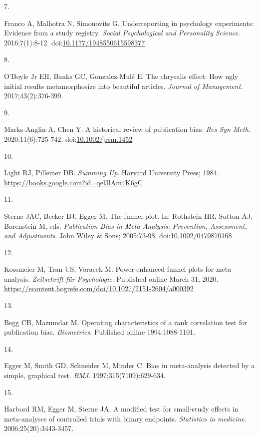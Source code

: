 \documentclass[
  american,
  man, donotrepeattitle,floatsintext]{apa7}
\newlength{\cslhangindent}
\newlength{\csllabelwidth}
\newenvironment{CSLReferences}[2] %
 {\begin{list}{}{%
  \setlength{\itemindent}{0pt}
  \setlength{\leftmargin}{0pt}
  \setlength{\parsep}{0pt}
  \ifodd #1
   \setlength{\leftmargin}{\cslhangindent}
   \setlength{\itemindent}{-1\cslhangindent}
  \fi
  \setlength{\itemsep}{#2\baselineskip}}}
 {\end{list}}
\newcommand{\CSLLeftMargin}[1]{\parbox[t]{\csllabelwidth}{\strut#1\strut}}
\newcommand{\CSLRightInline}[1]{\parbox[t]{\linewidth - \csllabelwidth}{\strut#1\strut}}
\begin{document}
\begin{CSLReferences}{0}{1}
\CSLLeftMargin{7. }%
\CSLRightInline{Franco A, Malhotra N, Simonovits G. Underreporting in psychology experiments: Evidence from a study registry. \emph{Social Psychological and Personality Science}. 2016;7(1):8-12. doi:\href{https://doi.org/10.1177/1948550615598377}{10.1177/1948550615598377}}

\CSLLeftMargin{8. }%
\CSLRightInline{O'Boyle Jr EH, Banks GC, Gonzalez-Mulé E. The chrysalis effect: How ugly initial results metamorphosize into beautiful articles. \emph{Journal of Management}. 2017;43(2):376-399.}

\CSLLeftMargin{9. }%
\CSLRightInline{Marks‐Anglin A, Chen Y. A historical review of publication bias. \emph{Res Syn Meth}. 2020;11(6):725-742. doi:\href{https://doi.org/10.1002/jrsm.1452}{10.1002/jrsm.1452}}

\CSLLeftMargin{10. }%
\CSLRightInline{Light RJ, Pillemer DB. \emph{Summing {Up}}. {Harvard University Press}; 1984. \url{https://books.google.com?id=qel3lAm4K6gC}}

\CSLLeftMargin{11. }%
\CSLRightInline{Sterne JAC, Becker BJ, Egger M. The funnel plot. In: Rothstein HR, Sutton AJ, Borenstein M, eds. \emph{Publication {Bias} in {Meta-Analysis}: {Prevention}, {Assessment}, and {Adjustments}}. {John Wiley \& Sons}; 2005:73-98. doi:\href{https://doi.org/10.1002/0470870168}{10.1002/0470870168}}

\CSLLeftMargin{12. }%
\CSLRightInline{Kossmeier M, Tran US, Voracek M. Power-enhanced funnel plots for meta-analysis. \emph{Zeitschrift für Psychologie}. Published online March 31, 2020. \url{https://econtent.hogrefe.com/doi/10.1027/2151-2604/a000392}}

\CSLLeftMargin{13. }%
\CSLRightInline{Begg CB, Mazumdar M. Operating characteristics of a rank correlation test for publication bias. \emph{Biometrics}. Published online 1994:1088-1101.}

\CSLLeftMargin{14. }%
\CSLRightInline{Egger M, Smith GD, Schneider M, Minder C. Bias in meta-analysis detected by a simple, graphical test. \emph{BMJ}. 1997;315(7109):629-634.}

\CSLLeftMargin{15. }%
\CSLRightInline{Harbord RM, Egger M, Sterne JA. A modified test for small-study effects in meta-analyses of controlled trials with binary endpoints. \emph{Statistics in medicine}. 2006;25(20):3443-3457.}


\end{CSLReferences}
\end{document}
